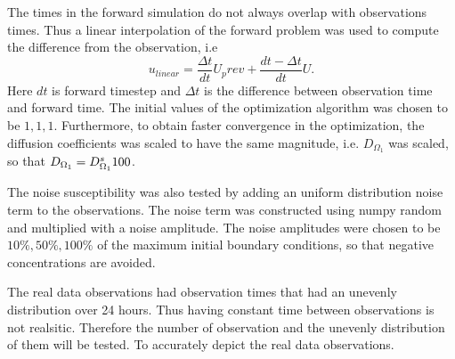\documentclass[11pt,a4paper]{article}
\begin{document}
The times in the forward simulation do not always overlap with observations times. Thus a linear interpolation of the forward problem was used to compute the difference from the observation, i.e 
\begin{equation}
u_{linear} = \frac{\Delta t}{dt} U_prev + \frac{dt - \Delta t }{dt} U.
\end{equation}
Here $dt$ is forward timestep and $\Delta t$ is the difference between observation time and forward time. 
The initial values of the optimization algorithm was chosen to be $1,1,1$. Furthermore, to obtain faster convergence in the optimization, the diffusion coefficients was scaled to have the same magnitude, i.e.  $D_{\Omega_1}$ was scaled, so that $D_{\Omega_1} = D\sp {s}_{\Omega_1}100$.     


The noise susceptibility was also tested by adding an uniform distribution noise term to the observations. The noise term was constructed using numpy random and multiplied with a noise amplitude. The noise amplitudes were chosen to be $ 10\%, 50\%, 100\%$ of the maximum initial boundary conditions, so that negative concentrations are avoided.  

The real data observations had observation times that had an unevenly distribution over 24 hours. Thus having  constant time between observations is not realsitic. Therefore the number of observation and the unevenly distribution of them will be tested. To accurately depict the real data observations. 
\end{document}

